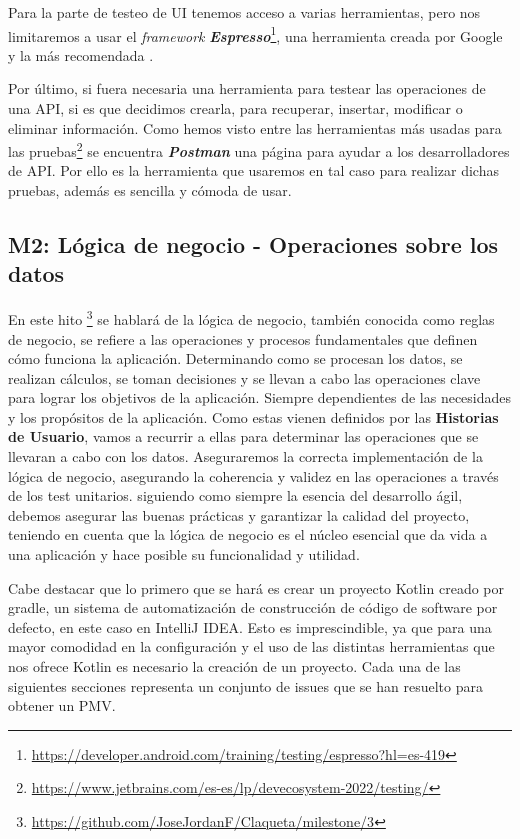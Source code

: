 Para la parte de testeo de UI tenemos acceso a varias herramientas, pero nos limitaremos a usar el 
\textit{framework} \textbf{\textit{Espresso}}\footnote{\url{https://developer.android.com/training/testing/espresso?hl=es-419}}, una herramienta creada por Google y la más recomendada \cite{UITest}.

Por último, si fuera necesaria una herramienta para testear las operaciones de una API, si es que 
decidimos crearla, para  recuperar, insertar, modificar o eliminar información. Como hemos visto entre 
las herramientas más usadas para las pruebas\footnote{\url{https://www.jetbrains.com/es-es/lp/devecosystem-2022/testing/}} se encuentra \textit{\textbf{Postman}} una página para ayudar a los 
desarrolladores de API. Por ello es la herramienta que usaremos en tal caso para realizar dichas 
pruebas, además es sencilla y cómoda de usar.

\subsection{M2: Lógica de negocio - Operaciones sobre los datos}

En este hito \footnote{\url{https://github.com/JoseJordanF/Claqueta/milestone/3}} se hablará de la 
lógica de negocio, también conocida como reglas de negocio, se refiere a las operaciones y procesos 
fundamentales que definen cómo funciona la aplicación. Determinando como se procesan los datos, se 
realizan cálculos, se toman decisiones y se llevan a cabo las operaciones clave para lograr los 
objetivos de la aplicación. Siempre dependientes de las necesidades y los propósitos de la aplicación. 
Como estas vienen definidos por las \textbf{Historias de Usuario}, vamos a recurrir a ellas para 
determinar las operaciones que se llevaran a cabo con los datos. Aseguraremos la correcta 
implementación de la lógica de negocio, asegurando la coherencia y validez en las operaciones a través 
de los test unitarios. siguiendo como siempre la esencia del desarrollo ágil, debemos asegurar las
buenas prácticas y garantizar la calidad del proyecto, teniendo en cuenta que la lógica de negocio es 
el núcleo esencial que da vida a una aplicación y hace posible su funcionalidad y utilidad. 

Cabe destacar que lo primero que se hará es crear un proyecto Kotlin creado por gradle, un sistema de 
automatización de construcción de código de software por defecto, en este caso en IntelliJ IDEA. Esto 
es imprescindible, ya que para una mayor comodidad en la configuración y el uso de las distintas 
herramientas que nos ofrece Kotlin es necesario la creación de un proyecto.
Cada una de las siguientes secciones representa un conjunto de issues que se han resuelto para obtener 
un PMV.


